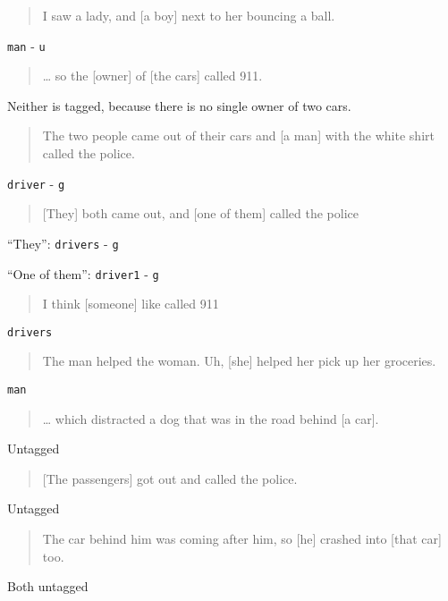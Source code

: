 \documentclass[
]{book}
\begin{document}
\begin{quote}
I saw a lady, and {[}a boy{]} next to her bouncing a ball.
\end{quote}

\texttt{man} - \texttt{u}

\begin{quote}
\ldots{} so the {[}owner{]} of {[}the cars{]} called 911.
\end{quote}

Neither is tagged, because there is no single owner of two cars.

\begin{quote}
The two people came out of their cars and {[}a man{]} with the white shirt called the police.
\end{quote}

\texttt{driver} - \texttt{g}

\begin{quote}
{[}They{]} both came out, and {[}one of them{]} called the police
\end{quote}

``They'': \texttt{drivers} - \texttt{g}

``One of them'': \texttt{driver1} - \texttt{g}

\begin{quote}
I think {[}someone{]} like called 911
\end{quote}

\texttt{drivers}

\begin{quote}
The man helped the woman. Uh, {[}she{]} helped her pick up her groceries.
\end{quote}

\texttt{man}

\begin{quote}
\ldots{} which distracted a dog that was in the road behind {[}a car{]}.
\end{quote}

Untagged

\begin{quote}
{[}The passengers{]} got out and called the police.
\end{quote}

Untagged

\begin{quote}
The car behind him was coming after him, so {[}he{]} crashed into {[}that car{]} too.
\end{quote}

Both untagged
\end{document}
